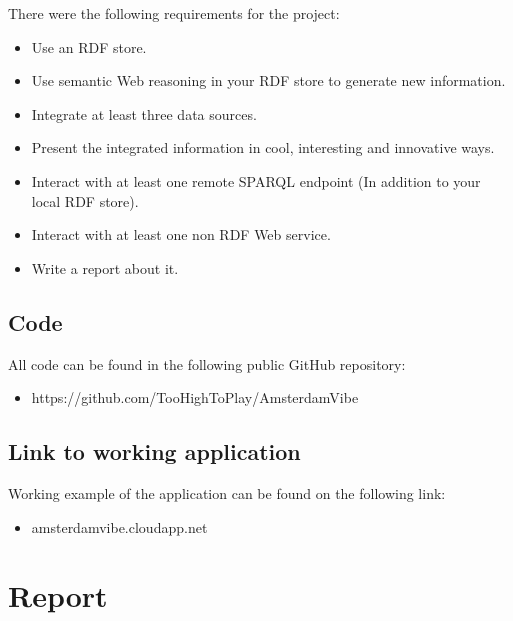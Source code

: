 \documentclass[12pt, a4paper, lithuanian]{article}
\begin{document}
There were the following requirements for the project:

\begin{itemize}
    \item Use an RDF store.

    \item Use semantic Web reasoning in your RDF store to generate new information.

    \item Integrate at least three data sources.

    \item Present the integrated information in cool, interesting and innovative ways.

    \item Interact with at least one remote SPARQL endpoint (In addition to your local RDF store).

    \item Interact with at least one non RDF Web service.

    \item Write a report about it.

\end{itemize}


\subsection{Code}

All code can be found in the following public GitHub repository:

\begin{itemize}

  \item https://github.com/TooHighToPlay/AmsterdamVibe

\end{itemize}

\subsection{Link to working application}

Working example of the application can be found on the following link:

\begin{itemize}

  \item amsterdamvibe.cloudapp.net

\end{itemize}

\section{Report}
\end{document}

